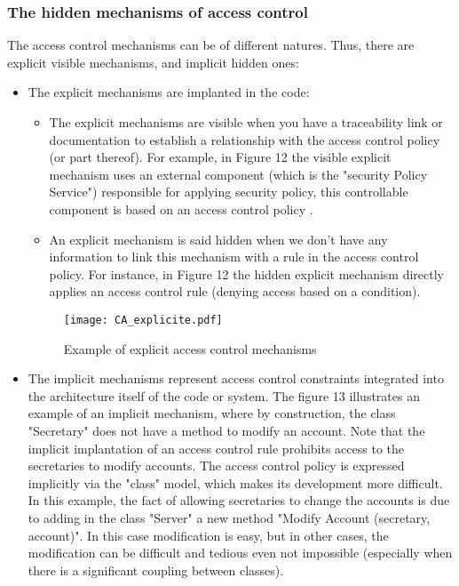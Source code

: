 \documentclass{acm_proc_article-sp}
\begin{document}
\subsubsection{The hidden mechanisms of access control}
The access control mechanisms can be of different natures. Thus, there are explicit visible mechanisms, and implicit hidden ones:
\begin{itemize}
 \item The explicit mechanisms are implanted in the code:
 \begin{itemize}
  \item The explicit mechanisms are visible when you have a traceability link or documentation to establish a relationship with the access control policy (or part thereof). For example, in Figure 12 the visible explicit mechanism uses an external component (which is the "security Policy Service") responsible for applying security policy, this controllable component is based on an access control policy .
  \item An explicit mechanism is said hidden when we don't have any information to link this mechanism with a rule in the access control policy. For instance, in Figure 12 the hidden explicit mechanism directly applies an access control rule (denying access based on a condition).
 \end{itemize}
\begin{figure}[h!]                                                       \centering                                                               \texttt{[image: CA\_explicite.pdf]}       \caption{Example of explicit access control mechanisms}                  \label{Example of explicit mechanisms for access control}                \end{figure}                                                             \item The implicit mechanisms represent access control constraints integrated into the architecture itself of the code or system. The figure 13 illustrates an example of an implicit mechanism, where by construction, the class "Secretary" does not have a method to modify an account. Note that the implicit implantation of an access control rule prohibits access to the secretaries to modify accounts. The access control policy is expressed implicitly via the "class" model, which makes its development more difficult. In this example, the fact of allowing secretaries to change the accounts is due to adding in the class "Server" a new method "Modify Account (secretary, account)". In this case modification is easy, but in other cases, the modification can be difficult and tedious even not impossible (especially when there is a significant coupling between classes).\\


\end{itemize}
\end{document}
